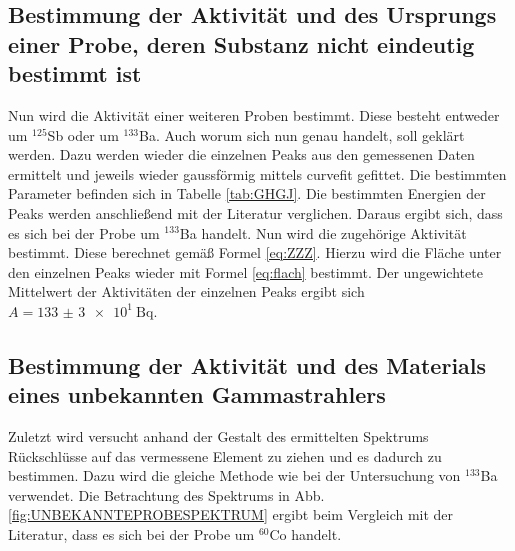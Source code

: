 \subsection{Bestimmung der Aktivität und des Ursprungs einer Probe, deren Substanz nicht eindeutig bestimmt ist}
Nun wird die Aktivität einer weiteren Proben bestimmt. Diese besteht entweder um $^{125}$Sb oder um $^{133}$Ba. Auch worum sich nun genau handelt, soll geklärt werden. Dazu werden wieder die einzelnen Peaks aus den gemessenen Daten ermittelt und jeweils wieder gaussförmig mittels curvefit\cite{scipy} gefittet. Die bestimmten Parameter befinden sich in Tabelle \ref{tab:GHGJ}. Die bestimmten Energien der Peaks werden anschließend mit der Literatur\cite{V18} verglichen. Daraus ergibt sich, dass es sich bei der Probe um $^{133}$Ba handelt. Nun wird die zugehörige Aktivität bestimmt. Diese berechnet gemäß Formel \eqref{eq:ZZZ}. Hierzu wird die Fläche unter den einzelnen Peaks wieder mit Formel \eqref{eq:flach} bestimmt. Der ungewichtete Mittelwert der Aktivitäten der einzelnen Peaks ergibt sich $A = \SI{133(3)e1}{\becquerel}$.


\subsection{Bestimmung der Aktivität und des Materials eines unbekannten Gammastrahlers}
Zuletzt wird versucht anhand der Gestalt des ermittelten Spektrums Rückschlüsse auf das vermessene Element zu ziehen und es dadurch zu bestimmen. Dazu wird die gleiche Methode wie bei der Untersuchung von $^{133}$Ba verwendet. Die Betrachtung des Spektrums in Abb. \ref{fig:UNBEKANNTEPROBESPEKTRUM} ergibt beim Vergleich mit der Literatur\cite{Co60}, dass es sich bei der Probe um $^{60}$Co handelt.%